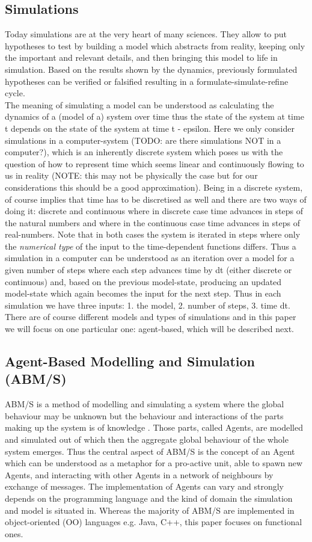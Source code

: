 \subsection{Simulations}
Today simulations are at the very heart of many sciences. They allow to put hypotheses to test by building a model which abstracts from reality, keeping only the important and relevant details, and then bringing this model to life in simulation. Based on the results shown by the dynamics, previously formulated hypotheses can be verified or falsified resulting in a formulate-simulate-refine cycle. \\
The meaning of simulating a model can be understood as calculating the dynamics of a (model of a) system over time thus the state of the system at time t depends on the state of the system at time t - epsilon. Here we only consider simulations in a computer-system (TODO: are there simulations NOT in a computer?), which is an inherently discrete system which poses us with the question of how to represent time which seems linear and continuously flowing to us in reality (NOTE: this may not be physically the case but for our considerations this should be a good approximation). Being in a discrete system, of course implies that time has to be discretised as well and there are two ways of doing it: discrete and continuous where in discrete case time advances in steps of the natural numbers and where in the continuous case time advances in steps of real-numbers. Note that in both cases the system is iterated in steps where only the \textit{numerical type} of the input to the time-dependent functions differs. Thus a simulation in a computer can be understood as an iteration over a model for a given number of steps where each step advances time by dt (either discrete or continuous) and, based on the previous model-state, producing an updated model-state which again becomes the input for the next step. Thus in each simulation we have three inputs: 1. the model, 2. number of steps, 3. time dt. There are of course different models and types of simulations and in this paper we will focus on one particular one: agent-based, which will be described next.

\subsection{Agent-Based Modelling and Simulation (ABM/S)}
ABM/S is a method of modelling and simulating a system where the global behaviour may be unknown but the behaviour and interactions of the parts making up the system is of knowledge \cite{wooldridge_introduction_2009}. Those parts, called Agents, are modelled and simulated out of which then the aggregate global behaviour of the whole system emerges. Thus the central aspect of ABM/S is the concept of an Agent which can be understood as a metaphor for a pro-active unit, able to spawn new Agents, and interacting with other Agents in a network of neighbours by exchange of messages. The implementation of Agents can vary and strongly depends on the programming language and the kind of domain the simulation and model is situated in. Whereas the majority of ABM/S are implemented in object-oriented (OO) languages e.g. Java, C++, this paper focuses on functional ones.